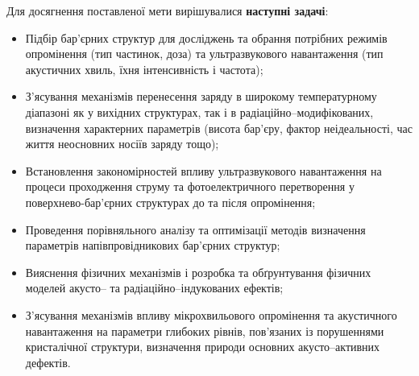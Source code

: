 Для досягнення поставленої мети вирішувалися \textbf{наступні задачі}:
\begin{itemize}[leftmargin=0em,itemindent=1.5em]
\renewcommand{\labelitemi}{$\bullet$}
  \item Підбір бар'єрних структур для досліджень та обрання потрібних режимів опромінення (тип частинок, доза) та ультразвукового навантаження (тип акустичних хвиль, їхня інтенсивність і частота);

  \item З'ясування механізмів перенесення заряду в широкому температурному діапазоні як у вихідних структурах, так і в радіаційно--модифікованих, визначення характерних параметрів (висота бар'єру, фактор неідеальності, час життя неосновних носіїв заряду тощо);

\item Встановлення закономірностей впливу ультразвукового навантаження на процеси проходження струму та фотоелектричного перетворення у поверхнево-бар'єрних структурах до та після опромінення;


 \item Проведення порівняльного аналізу та оптимізації методів визначення параметрів напівпровідникових бар'єрних структур;
%


  \item Вияснення фізичних механізмів і розробка та обґрунтування фізичних моделей акусто-- та радіаційно--індукованих ефектів;

  \item З'ясування механізмів впливу мікрохвильового опромінення та акустичного навантаження на параметри глибоких рівнів, пов'язаних із порушеннями кристалічної структури,
  визначення природи основних акусто--активних дефектів.

\end{itemize}


